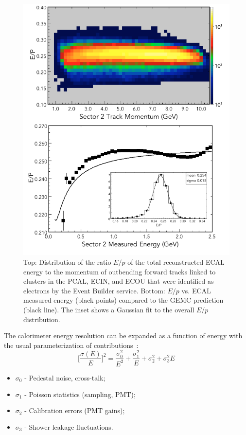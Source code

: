 \begin{figure}[t]
\centering
\includegraphics[width=1.0\columnwidth,keepaspectratio]{img/S10_1_0.png}
\caption[]{Top: Distribution of the ratio $E/p$ of the total reconstructed ECAL energy to the momentum of
  outbending forward tracks linked to clusters in the PCAL, ECIN, and ECOU that were identified as electrons by
  the Event Builder service. Bottom: $E/p$ vs. ECAL measured energy (black points) compared to the GEMC
  prediction (black line). The inset shows a Gaussian fit to the overall $E/p$ distribution.}
\label{fig:S10_1_0}
\end{figure}

The calorimeter energy resolution can be expanded as a function of energy with the usual parameterization of
contributions~\cite{ps1981}:
\begin{equation}
\biggl[\frac{\sigma(E)}{E}\biggr]^2 = \frac{\sigma^2_0}{E^2} + \frac{\sigma^2_1}{E} +\sigma^2_2 + \sigma^2_3 E 
\label{eq:sferror}
\end{equation}

\begin{itemize}
\item $\sigma_0$ - Pedestal noise, cross-talk;
\item $\sigma_1$ - Poisson statistics (sampling, PMT);
\item $\sigma_2$ - Calibration errors (PMT gains);
\item $\sigma_3$ - Shower leakage fluctuations.
\end{itemize}

